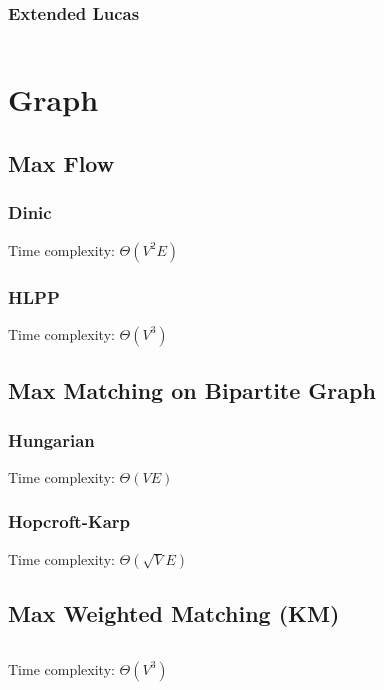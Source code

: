 \documentclass[a4paper, 11pt]{article}   	%
\begin{document}
\subsubsection{Extended Lucas}

\inputminted[breaklines, linenos]{cpp}{math/exlucas.cpp}

\section{Graph}

\subsection{Max Flow}

\subsubsection{Dinic}

Time complexity: $\Theta(V^2E)$

\subsubsection{HLPP}

Time complexity: $\Theta(V^3)$

\subsection{Max Matching on Bipartite Graph}

\subsubsection{Hungarian}

Time complexity: $\Theta(VE)$

\subsubsection{Hopcroft-Karp}

Time complexity: $\Theta(\sqrt V E)$

\subsection{Max Weighted Matching (KM)}

\inputminted[breaklines, linenos]{cpp}{graph/km.cpp}

Time complexity: $\Theta(V^3)$
\end{document}
